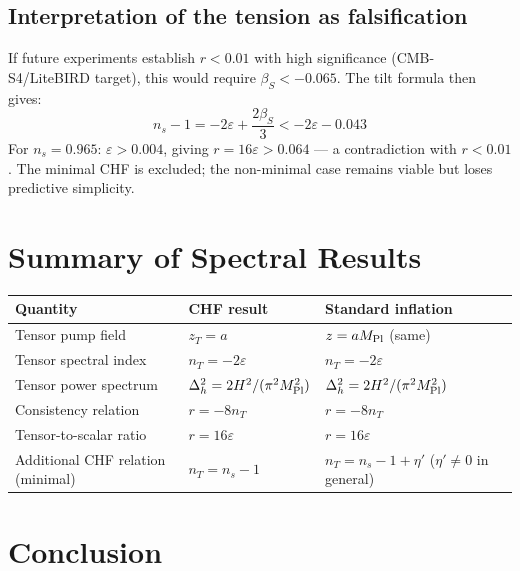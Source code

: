 \documentclass[12pt,a4paper]{article}
\begin{document}
\subsection{Interpretation of the tension as falsification}

If future experiments establish $r < 0.01$ with high significance (CMB-S4/LiteBIRD target), this would require $\beta_S < -0.065$. The tilt formula then gives:
\begin{equation}
n_s - 1 = -2\varepsilon + \frac{2\beta_S}{3} < -2\varepsilon - 0.043 \tag{26}
\end{equation}
For $n_s = 0.965$: $\varepsilon > 0.004$, giving $r = 16\varepsilon > 0.064$ --- a contradiction with $r < 0.01$. The minimal CHF is excluded; the non-minimal case remains viable but loses predictive simplicity.

\section{Summary of Spectral Results}

\begin{table}[h]
\centering
\small
\begin{tabular}{lll}
\toprule
Quantity & CHF result & Standard inflation \\
\midrule
Tensor pump field & $z_T = a$ & $z = aM_{\rm Pl}$ (same) \\
Tensor spectral index & $n_T = -2\varepsilon$ & $n_T = -2\varepsilon$ \\
Tensor power spectrum & $\Delta_h^2 = 2H^2/(\pi^2 M_{\rm Pl}^2)$ & $\Delta_h^2 = 2H^2/(\pi^2 M_{\rm Pl}^2)$ \\
Consistency relation & $r = -8n_T$ & $r = -8n_T$ \\
Tensor-to-scalar ratio & $r = 16\varepsilon$ & $r = 16\varepsilon$ \\
Additional CHF relation (minimal) & $n_T = n_s - 1$ & $n_T = n_s - 1 + \eta'$ ($\eta' \neq 0$ in general) \\
\bottomrule
\end{tabular}
\end{table}

\section{Conclusion}
\end{document}
